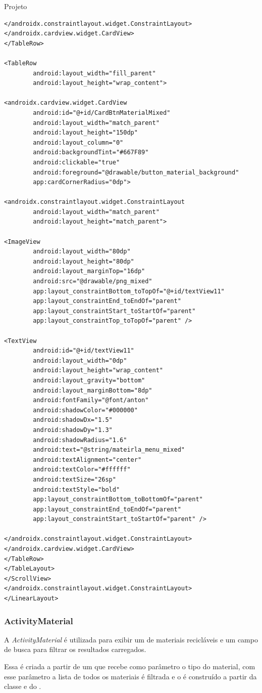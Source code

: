 \documentclass[
	12pt,				%
	openright,			%
	twoside,			%
	a4paper,			%
	english,			%
	french,				%
	spanish,			%
	brazil				%
	]{abntex2}
\begin{document}
\begin{chapter}{Projeto}
\begin{lstlisting}[numbers=none,basicstyle=\small,
caption={FragmentMaterialMenu.xml},
title={FragmentMaterialMenu.xml},
label={fragment_material_menu.xml}]
</androidx.constraintlayout.widget.ConstraintLayout>
</androidx.cardview.widget.CardView>
</TableRow>

<TableRow
		android:layout_width="fill_parent"
		android:layout_height="wrap_content">

<androidx.cardview.widget.CardView
		android:id="@+id/CardBtnMaterialMixed"
		android:layout_width="match_parent"
		android:layout_height="150dp"
		android:layout_column="0"
		android:backgroundTint="#667F89"
		android:clickable="true"
		android:foreground="@drawable/button_material_background"
		app:cardCornerRadius="0dp">

<androidx.constraintlayout.widget.ConstraintLayout
		android:layout_width="match_parent"
		android:layout_height="match_parent">

<ImageView
		android:layout_width="80dp"
		android:layout_height="80dp"
		android:layout_marginTop="16dp"
		android:src="@drawable/png_mixed"
		app:layout_constraintBottom_toTopOf="@+id/textView11"
		app:layout_constraintEnd_toEndOf="parent"
		app:layout_constraintStart_toStartOf="parent"
		app:layout_constraintTop_toTopOf="parent" />

<TextView
		android:id="@+id/textView11"
		android:layout_width="0dp"
		android:layout_height="wrap_content"
		android:layout_gravity="bottom"
		android:layout_marginBottom="8dp"
		android:fontFamily="@font/anton"
		android:shadowColor="#000000"
		android:shadowDx="1.5"
		android:shadowDy="1.3"
		android:shadowRadius="1.6"
		android:text="@string/mateirla_menu_mixed"
		android:textAlignment="center"
		android:textColor="#ffffff"
		android:textSize="26sp"
		android:textStyle="bold"
		app:layout_constraintBottom_toBottomOf="parent"
		app:layout_constraintEnd_toEndOf="parent"
		app:layout_constraintStart_toStartOf="parent" />

</androidx.constraintlayout.widget.ConstraintLayout>
</androidx.cardview.widget.CardView>
</TableRow>
</TableLayout>
</ScrollView>
</androidx.constraintlayout.widget.ConstraintLayout>
</LinearLayout>
\end{lstlisting}

\subsubsection{ActivityMaterial} \label{ActivityMaterial}
A \textit{ActivityMaterial} é utilizada para exibir um  de materiais recicláveis e um campo de busca para filtrar os resultados carregados.

Essa  é criada a partir de um  que recebe como parâmetro o tipo do material, com esse parâmetro a lista de todos os materiais é filtrada e o  é construído a partir da classe  e do .


\end{chapter}
\end{document}
